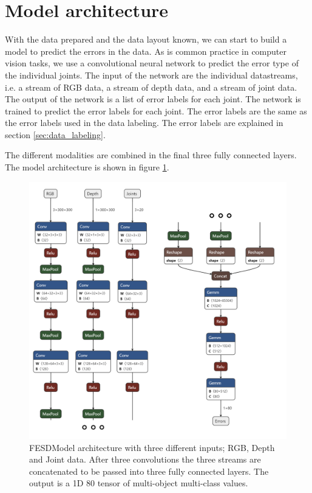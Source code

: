 \section{Model architecture}
\label{sec:model_architecture}

With the data prepared and the data layout known, we can start to build a model to predict the errors in the data. As is common practice in computer vision tasks, we use a convolutional neural network to predict the error type of the individual joints. The input of the network are the individual datastreams, i.e. a stream of RGB data, a stream of depth data, and a stream of joint data. The output of the network is a list of error labels for each joint. The network is trained to predict the error labels for each joint. The error labels are the same as the error labels used in the data labeling. The error labels are explained in section \ref{sec:data_labeling}. 

The different modalities are combined in the final three fully connected layers. The model architecture is shown in figure \ref{fig:model_architecture}.

\begin{figure}[h]
  \centering
  \includegraphics[width=\linewidth]{figures/Model/FESD.png}
  \caption[FESDModel architecture]{FESDModel architecture with three different inputs; RGB, Depth and Joint data. After three convolutions the three streams are concatenated to be passed into three fully connected layers. The output is a 1D 80 tensor of multi-object multi-class values.}
  \label{fig:model_architecture}
\end{figure}

